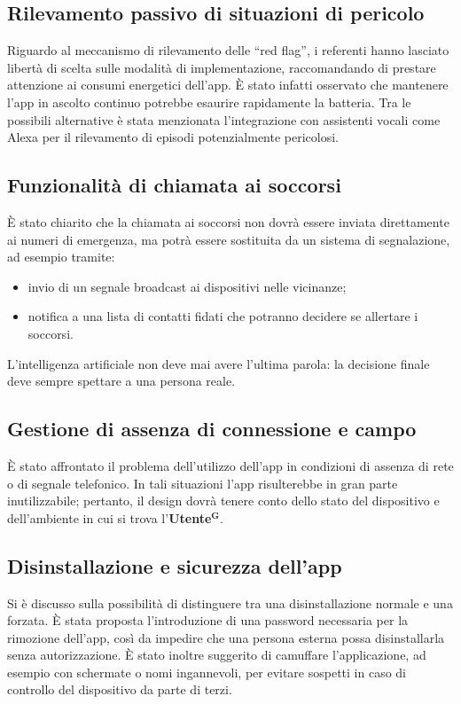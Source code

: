 \documentclass[a4paper,12pt]{article}
\newcommand{\term}[1]{\textbf{#1}$^\mathbf{G}$}
\begin{document}
\subsection{Rilevamento passivo di situazioni di pericolo}
Riguardo al meccanismo di rilevamento delle “red flag”, i referenti hanno lasciato libertà di scelta sulle modalità di implementazione, raccomandando di prestare attenzione ai consumi energetici dell'app.  
È stato infatti osservato che mantenere l’app in ascolto continuo potrebbe esaurire rapidamente la batteria. Tra le possibili alternative è stata menzionata l’integrazione con assistenti vocali come Alexa per il rilevamento di episodi potenzialmente pericolosi.

\subsection{Funzionalità di chiamata ai soccorsi}
È stato chiarito che la chiamata ai soccorsi non dovrà essere inviata direttamente ai numeri di emergenza, ma potrà essere sostituita da un sistema di segnalazione, ad esempio tramite:
\begin{itemize}
    \item invio di un segnale broadcast ai dispositivi nelle vicinanze;
    \item notifica a una lista di contatti fidati che potranno decidere se allertare i soccorsi.
\end{itemize}
L’intelligenza artificiale non deve mai avere l’ultima parola: la decisione finale deve sempre spettare a una persona reale.

\subsection{Gestione di assenza di connessione e campo}
È stato affrontato il problema dell’utilizzo dell’app in condizioni di assenza di rete o di segnale telefonico.  
In tali situazioni l’app risulterebbe in gran parte inutilizzabile; pertanto, il design dovrà tenere conto dello stato del dispositivo e dell’ambiente in cui si trova l’\term{Utente}.

\subsection{Disinstallazione e sicurezza dell’app}
Si è discusso sulla possibilità di distinguere tra una disinstallazione normale e una forzata.  
È stata proposta l’introduzione di una password necessaria per la rimozione dell’app, così da impedire che una persona esterna possa disinstallarla senza autorizzazione.  
È stato inoltre suggerito di camuffare l’applicazione, ad esempio con schermate o nomi ingannevoli, per evitare sospetti in caso di controllo del dispositivo da parte di terzi.
\end{document}

